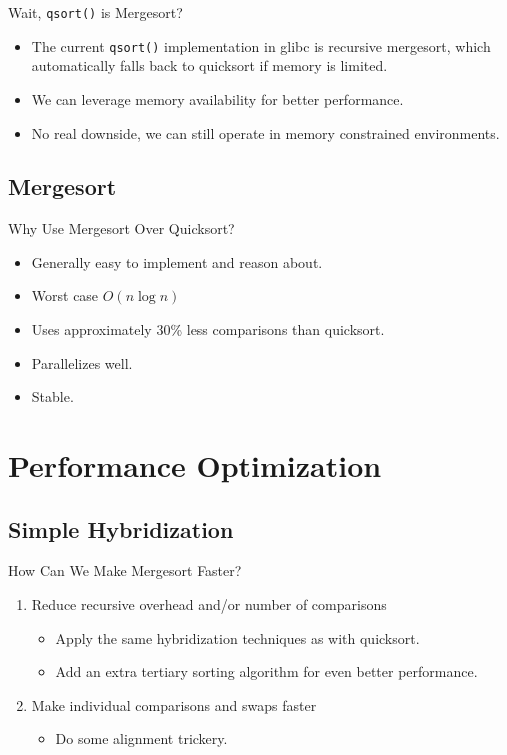 \documentclass[13pt]{beamer}
\begin{document}
\begin{frame}{Wait, \texttt{qsort()} is Mergesort?}
	\pause
	\begin{itemize}[<+->]
		\item The current \texttt{qsort()} implementation in glibc is recursive
		      mergesort, which automatically falls back to quicksort if memory is
		      limited.
		\item We can leverage memory availability for better performance.
		\item No real downside, we can still operate in memory constrained environments.
	\end{itemize}
\end{frame}

\subsection{Mergesort}
\begin{frame}{Why Use Mergesort Over Quicksort?}
	\pause
	\begin{itemize}[<+->]
		\item Generally easy to implement and reason about.
		\item Worst case $O(n\log{n})$
		\item Uses approximately 30\% less comparisons than quicksort.
		\item Parallelizes well.
		\item Stable.
	\end{itemize}
\end{frame}

\section{Performance Optimization}
\subsection{Simple Hybridization}
\begin{frame}{How Can We Make Mergesort Faster?}
	\begin{enumerate}
		\item\pause Reduce recursive overhead and/or number of comparisons
		\begin{itemize}
			\item Apply the same hybridization techniques as with quicksort.
			\item Add an extra tertiary sorting algorithm for even better performance.
		\end{itemize}
		\item\pause Make individual comparisons and swaps faster
		\begin{itemize}[]
			\item Do some alignment trickery.
		\end{itemize}
	\end{enumerate}
\end{frame}
\end{document}

